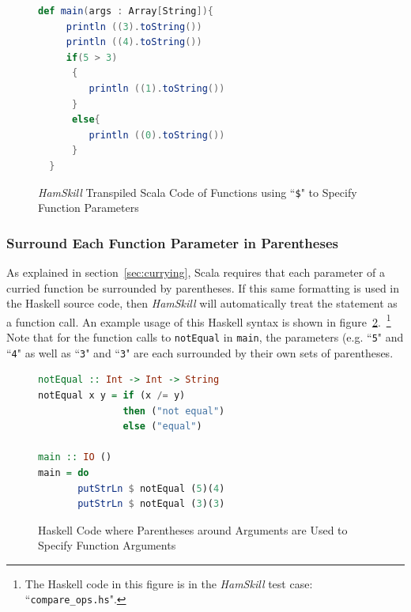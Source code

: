 \documentclass{report}
\begin{document}
\begin{figure}[H]
\begin{mdframed}
\begin{lstlisting}[basicstyle=\small, language=scala]
  def main(args : Array[String]){
     println ((3).toString())
     println ((4).toString())
     if(5 > 3)
      {
         println ((1).toString())
      }
      else{
         println ((0).toString())
      }
  } 
\end{lstlisting}
\end{mdframed}
\caption{\textit{HamSkill} Transpiled Scala Code of Functions using ``\texttt{\$}" to Specify Function Parameters}\label{fig:useDollarSignScala}
\end{figure}

\subsubsection{Surround Each Function Parameter in Parentheses}

As explained in section~\ref{sec:currying}, Scala requires that each parameter of a curried function be surrounded by parentheses. If this same formatting is used in the Haskell source code, then \textit{HamSkill} will automatically treat the statement as a function call.  An example usage of this Haskell syntax is shown in figure~\ref{fig:haskellFunctionParenthesesFuncArgs}.~\footnote{The Haskell code in this figure is in the \textit{HamSkill} test case: ``\texttt{compare\_ops.hs}".}  Note that for the function calls to \texttt{notEqual} in \texttt{main}, the parameters (e.g. ``\texttt{5}" and ``\texttt{4}" as well as ``\texttt{3}" and ``\texttt{3}" are each surrounded by their own sets of parentheses.

\begin{figure}[H]
\begin{mdframed}
\begin{lstlisting}[language=Haskell]
notEqual :: Int -> Int -> String
notEqual x y = if (x /= y)
               then ("not equal")
               else ("equal")
               
main :: IO ()
main = do 
       putStrLn $ notEqual (5)(4)
       putStrLn $ notEqual (3)(3)
\end{lstlisting}
\end{mdframed}
\caption{Haskell Code where Parentheses around Arguments are Used to Specify Function Arguments}\label{fig:haskellFunctionParenthesesFuncArgs}
\end{figure}
\end{document}
